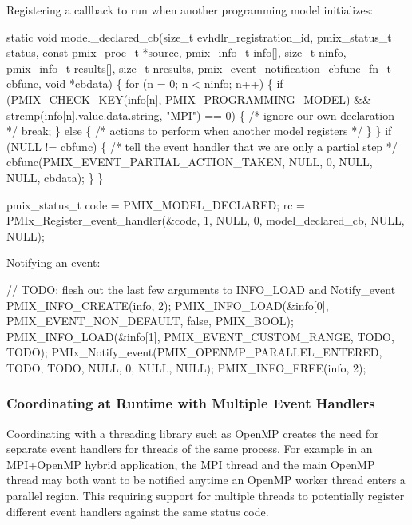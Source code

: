 Registering a callback to run when another programming model initializes:
\cspecificstart
\begin{codepar}
static void
model_declared_cb(size_t evhdlr_registration_id, pmix_status_t status,
                  const pmix_proc_t *source, pmix_info_t info[],
                  size_t ninfo, pmix_info_t results[], size_t nresults,
                  pmix_event_notification_cbfunc_fn_t cbfunc,
                  void *cbdata)
\{
    for (n = 0; n < ninfo; n++)  \{
        if  (PMIX_CHECK_KEY(info[n], PMIX_PROGRAMMING_MODEL) &&
             strcmp(info[n].value.data.string, "MPI") == 0) \{
            /* ignore our own declaration */
            break;
        \} else \{
            /* actions to perform when another model registers */
        \}
    \}
    if (NULL != cbfunc) \{
        /* tell the event handler that we are only a partial step */
        cbfunc(PMIX_EVENT_PARTIAL_ACTION_TAKEN, NULL, 0, NULL, NULL,
               cbdata);
    \}
\}

pmix_status_t code = PMIX_MODEL_DECLARED;
rc = PMIx_Register_event_handler(&code, 1, NULL, 0, model_declared_cb,
                                 NULL, NULL);
\end{codepar}
\cspecificend

Notifying an event:
\cspecificstart
\begin{codepar}
// TODO: flesh out the last few arguments to INFO_LOAD and Notify_event
PMIX_INFO_CREATE(info, 2);
PMIX_INFO_LOAD(&info[0], PMIX_EVENT_NON_DEFAULT, false, PMIX_BOOL);
PMIX_INFO_LOAD(&info[1], PMIX_EVENT_CUSTOM_RANGE, TODO, TODO);
PMIx_Notify_event(PMIX_OPENMP_PARALLEL_ENTERED, TODO, TODO, NULL, 0,
                  NULL, NULL);
PMIX_INFO_FREE(info, 2);
\end{codepar}
\cspecificend


\subsubsection{Coordinating at Runtime with Multiple Event Handlers}

Coordinating with a threading library such as OpenMP creates the need for separate event handlers for threads of the same process.  For example in an MPI+OpenMP hybrid application, the MPI thread and the main OpenMP thread may both want to be notified anytime an OpenMP worker thread enters a parallel region.  This requiring support for multiple threads to potentially register different event handlers against the same status code.

